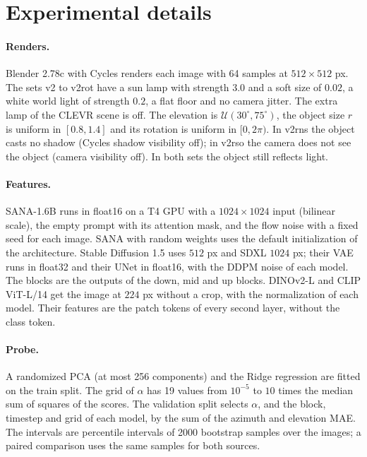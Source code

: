 \documentclass[10pt]{article}
\newcommand{\degr}{^\circ}
\begin{document}
\section{Experimental details}
\label{app:details}

\paragraph{Renders.}
Blender 2.78c with Cycles renders each image with 64 samples at $512\times512$ px.
The sets v2 to v2rot have a sun lamp with strength $3.0$ and a soft size of $0.02$, a white world light of strength $0.2$, a flat floor and no camera jitter. The extra lamp of the CLEVR scene is off.
The elevation is $\mathcal{U}(30\degr,75\degr)$, the object size $r$ is uniform in $[0.8,1.4]$ and its rotation is uniform in $[0,2\pi)$.
In v2rns the object casts no shadow (Cycles shadow visibility off); in v2rso the camera does not see the object (camera visibility off). In both sets the object still reflects light.

\paragraph{Features.}
SANA-1.6B runs in float16 on a T4 GPU with a $1024\times1024$ input (bilinear scale), the empty prompt with its attention mask, and the flow noise with a fixed seed for each image.
SANA with random weights uses the default initialization of the architecture.
Stable Diffusion 1.5 uses $512$ px and SDXL $1024$ px; their VAE runs in float32 and their UNet in float16, with the DDPM noise of each model. The blocks are the outputs of the down, mid and up blocks.
DINOv2-L and CLIP ViT-L/14 get the image at $224$ px without a crop, with the normalization of each model. Their features are the patch tokens of every second layer, without the class token.

\paragraph{Probe.}
A randomized PCA (at most 256 components) and the Ridge regression are fitted on the train split. The grid of $\alpha$ has 19 values from $10^{-5}$ to $10$ times the median sum of squares of the scores. The validation split selects $\alpha$, and the block, timestep and grid of each model, by the sum of the azimuth and elevation MAE.
The intervals are percentile intervals of 2000 bootstrap samples over the images; a paired comparison uses the same samples for both sources.
\end{document}

